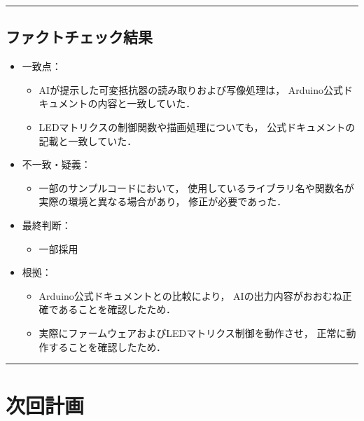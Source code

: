 \documentclass[uplatex,dvipdfmx,a4paper,11pt]{jsarticle}
\newcommand{\sectionrule}{\par\medskip\noindent\rule{\linewidth}{0.6pt}\par\medskip}
\begin{document}
\sectionrule

\subsection{ファクトチェック結果}


\begin{itemize}

    \item 一致点：
      \begin{itemize}
        \item AIが提示した可変抵抗器の読み取りおよび写像処理は，
        Arduino公式ドキュメントの内容と一致していた．

        \item LEDマトリクスの制御関数や描画処理についても，
        公式ドキュメントの記載と一致していた．
      \end{itemize}

      \item 不一致・疑義：
    \begin{itemize}
      \item 一部のサンプルコードにおいて，
      使用しているライブラリ名や関数名が実際の環境と異なる場合があり，
      修正が必要であった．
    \end{itemize}

  \item 最終判断：
    \begin{itemize}
      \item 一部採用
    \end{itemize}

    \item 根拠：
    \begin{itemize}
      \item Arduino公式ドキュメントとの比較により，
      AIの出力内容がおおむね正確であることを確認したため．

      \item 実際にファームウェアおよびLEDマトリクス制御を動作させ，
      正常に動作することを確認したため．
    \end{itemize}

\end{itemize}


\sectionrule


\section{次回計画}
\end{document}
